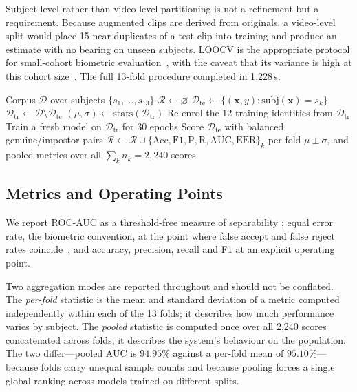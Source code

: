 \documentclass[journal]{IEEEtran}
\begin{document}
Subject-level rather than video-level partitioning is not a refinement but a
requirement. Because augmented clips are derived from originals, a video-level
split would place 15 near-duplicates of a test clip into training and produce
an estimate with no bearing on unseen subjects. LOOCV is the appropriate
protocol for small-cohort biometric evaluation~\cite{iso19795}, with the caveat
that its variance is high at this cohort size~\cite{varoquaux_small}. The full
13-fold procedure completed in 1{,}228\,s.

\begin{algorithm}[!t]
\caption{Leave-One-Subject-Out Evaluation}
\label{alg:loocv}
\begin{algorithmic}[1]
\REQUIRE Corpus $\mathcal{D}$ over subjects $\{s_1,\dots,s_{13}\}$
\STATE $\mathcal{R} \leftarrow \varnothing$
  \STATE $\mathcal{D}_{\text{te}} \leftarrow
         \{(\mathbf{x},y) : \mathrm{subj}(\mathbf{x}) = s_k\}$
  \STATE $\mathcal{D}_{\text{tr}} \leftarrow
         \mathcal{D} \setminus \mathcal{D}_{\text{te}}$
  \STATE $(\mu,\sigma) \leftarrow
         \mathrm{stats}(\mathcal{D}_{\text{tr}})$
  \STATE Re-enrol the 12 training identities from $\mathcal{D}_{\text{tr}}$
  \STATE Train a fresh model on $\mathcal{D}_{\text{tr}}$ for 30 epochs
  \STATE Score $\mathcal{D}_{\text{te}}$ with balanced genuine/impostor pairs
  \STATE $\mathcal{R} \leftarrow \mathcal{R} \cup
         \{\mathrm{Acc},\mathrm{F1},\mathrm{P},\mathrm{R},
         \mathrm{AUC},\mathrm{EER}\}_k$
\ENDFOR
\RETURN per-fold $\mu \pm \sigma$, and pooled metrics over all
        $\sum_k n_k = 2{,}240$ scores
\end{algorithmic}
\end{algorithm}

\subsection{Metrics and Operating Points}

We report ROC-AUC as a threshold-free measure of separability
\cite{fawcett_roc}; equal error rate, the biometric convention, at the point
where false accept and false reject rates coincide~\cite{iso19795}; and
accuracy, precision, recall and F1 at an explicit operating point.

Two aggregation modes are reported throughout and should not be conflated. The
\emph{per-fold} statistic is the mean and standard deviation of a metric
computed independently within each of the 13 folds; it describes how much
performance varies by subject. The \emph{pooled} statistic is computed once
over all 2{,}240 scores concatenated across folds; it describes the system's
behaviour on the population. The two differ---pooled AUC is $94.95\%$ against a
per-fold mean of $95.10\%$---because folds carry unequal sample counts and
because pooling forces a single global ranking across models trained on
different splits.
\end{document}
